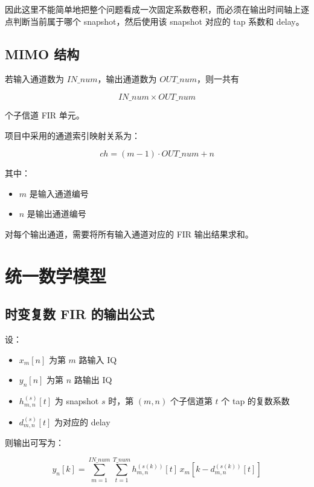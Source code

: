 \documentclass[12pt,a4paper]{article}
\begin{document}
因此这里不能简单地把整个问题看成一次固定系数卷积，而必须在输出时间轴上逐点判断当前属于哪个 snapshot，然后使用该 snapshot 对应的 tap 系数和 delay。

\subsection{MIMO 结构}

若输入通道数为 $IN\_num$，输出通道数为 $OUT\_num$，则一共有

\begin{equation}
IN\_num \times OUT\_num
\end{equation}

个子信道 FIR 单元。

项目中采用的通道索引映射关系为：

\begin{equation}
ch = (m - 1)\cdot OUT\_num + n
\end{equation}

其中：

\begin{itemize}
\item $m$ 是输入通道编号
\item $n$ 是输出通道编号
\end{itemize}

对每个输出通道，需要将所有输入通道对应的 FIR 输出结果求和。

\section{统一数学模型}

\subsection{时变复数 FIR 的输出公式}

设：

\begin{itemize}
\item $x_m[n]$ 为第 $m$ 路输入 IQ
\item $y_n[n]$ 为第 $n$ 路输出 IQ
\item $h_{m,n}^{(s)}[t]$ 为 snapshot $s$ 时，第 $(m,n)$ 个子信道第 $t$ 个 tap 的复数系数
\item $d_{m,n}^{(s)}[t]$ 为对应的 delay
\end{itemize}

则输出可写为：

\begin{equation}
y_n[k]
=
\sum_{m=1}^{IN\_num}
\sum_{t=1}^{T\_num}
h_{m,n}^{(s(k))}[t]\,
x_m\!\left[k - d_{m,n}^{(s(k))}[t]\right]
\end{equation}
\end{document}
